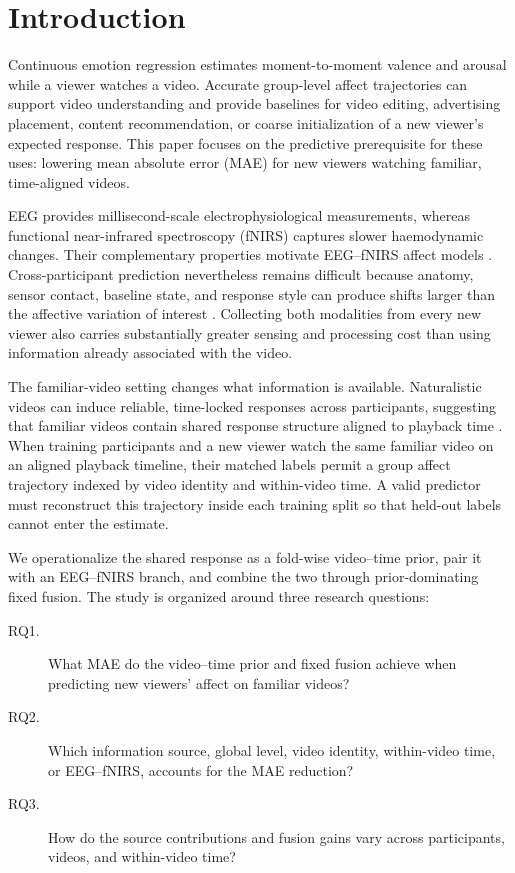 \section{Introduction}
\label{sec:introduction}

Continuous emotion regression estimates moment-to-moment valence and arousal
while a viewer watches a video. Accurate group-level affect trajectories can
support video understanding and provide baselines for video editing,
advertising placement, content recommendation, or coarse initialization of a
new viewer's expected response. This paper focuses on the predictive
prerequisite for these uses: lowering mean absolute error (MAE) for new viewers
watching familiar, time-aligned videos.

EEG provides millisecond-scale electrophysiological measurements, whereas
functional near-infrared spectroscopy (fNIRS) captures slower haemodynamic
changes. Their complementary properties motivate EEG--fNIRS affect models
\cite{bandara2018fnirs,sun2020multimodal,chen2024eegfnirs}. Cross-participant
prediction nevertheless remains difficult because anatomy, sensor contact,
baseline state, and response style can produce shifts larger than the affective
variation of interest \cite{li2022eegreview,li2018crosssubject}. Collecting both
modalities from every new viewer also carries substantially greater sensing and
processing cost than using information already associated with the video.

The familiar-video setting changes what information is available. Naturalistic
videos can induce reliable, time-locked responses across participants, suggesting
that familiar videos contain shared response structure aligned to playback time
\cite{hasson2004intersubject,kauppi2010isc,dmochowski2012correlated}.
When training participants and a new viewer watch the same familiar video on
an aligned playback timeline, their matched labels permit a group affect
trajectory indexed by video identity and within-video time. A valid predictor
must reconstruct this trajectory inside each training split so that held-out
labels cannot enter the estimate.

We operationalize the shared response as a fold-wise video--time prior, pair it
with an EEG--fNIRS branch, and combine the two through prior-dominating fixed
fusion. The study is organized around three research questions:

\begin{description}
  \item[RQ1.] What MAE do the video--time prior and fixed fusion achieve when
  predicting new viewers' affect on familiar videos?
  \item[RQ2.] Which information source, global level, video identity,
  within-video time, or EEG--fNIRS, accounts for the MAE reduction?
  \item[RQ3.] How do the source contributions and fusion gains vary across
  participants, videos, and within-video time?
\end{description}

